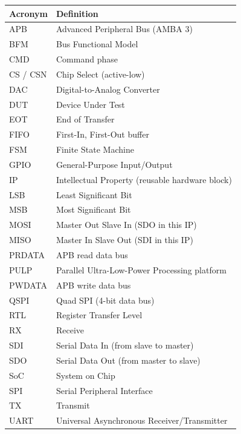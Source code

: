 \begin{longtable}{@{}ll@{}}
\toprule
\textbf{Acronym} & \textbf{Definition} \\
\midrule
\endhead
APB     & Advanced Peripheral Bus (AMBA 3) \\
BFM     & Bus Functional Model \\
CMD     & Command phase \\
CS / CSN & Chip Select (active-low) \\
DAC     & Digital-to-Analog Converter \\
DUT     & Device Under Test \\
EOT     & End of Transfer \\
FIFO    & First-In, First-Out buffer \\
FSM     & Finite State Machine \\
GPIO    & General-Purpose Input/Output \\
IP      & Intellectual Property (reusable hardware block) \\
LSB     & Least Significant Bit \\
MSB     & Most Significant Bit \\
MOSI    & Master Out Slave In (SDO in this IP) \\
MISO    & Master In Slave Out (SDI in this IP) \\
PRDATA  & APB read data bus \\
PULP    & Parallel Ultra-Low-Power Processing platform \\
PWDATA  & APB write data bus \\
QSPI    & Quad SPI (4-bit data bus) \\
RTL     & Register Transfer Level \\
RX      & Receive \\
SDI     & Serial Data In (from slave to master) \\
SDO     & Serial Data Out (from master to slave) \\
SoC     & System on Chip \\
SPI     & Serial Peripheral Interface \\
TX      & Transmit \\
UART    & Universal Asynchronous Receiver/Transmitter \\
\bottomrule
\end{longtable}
